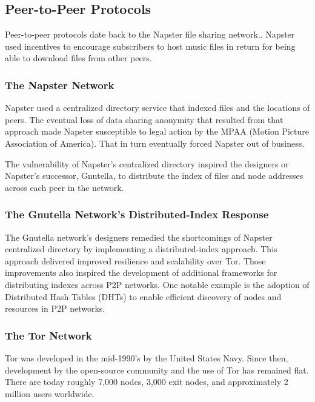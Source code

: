 \subsection{Peer-to-Peer Protocols}
Peer-to-peer protocols date back to the Napster file sharing network.\cite{42}. Napster used incentives to encourage subscribers to host music files in return for being able to download files from other peers.

\subsubsection{The Napster Network}
Napster used a centralized directory service that indexed files and the locations of peers. The eventual loss of data sharing anonymity that resulted from that approach made Napster susceptible to legal action by the MPAA (Motion Picture Association of America). That in turn eventually forced Napster out of business.

The vulnerability of Napster's centralized directory inspired the designers or Napster's successor, Gnutella, to  distribute the index of files and node addresses across each peer in the network\cite{43}.

\subsubsection{The Gnutella Network's Distributed-Index Response}
The Gnutella network's designers remedied the shortcomings of Napster centralized directory by implementing a distributed-index approach. This approach delivered improved resilience and scalability over Tor. Those improvements also inspired the development of additional frameworks for distributing indexes across P2P networks. One notable example is the adoption of Distributed Hash Tables (DHTs) to enable efficient discovery of nodes and resources in P2P networks.

\subsubsection{The Tor Network}
\label{subsec: tornetwork}

Tor was developed in the mid-1990’s by the United States Navy. Since then, development by the open-source community and the use of Tor has remained flat. There are today roughly 7,000 nodes, 3,000 exit nodes, and approximately 2 million users worldwide.


